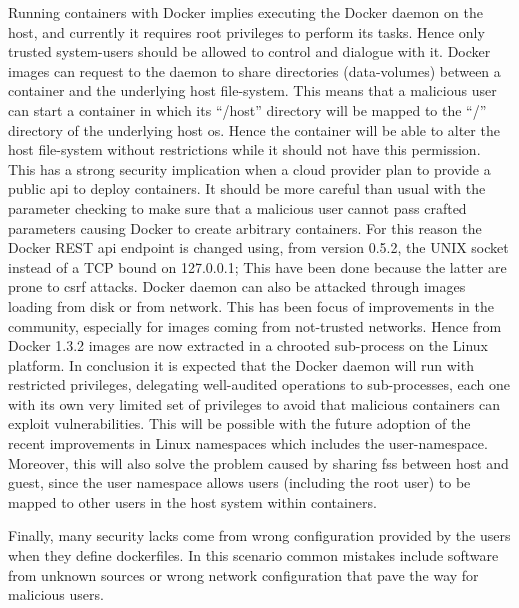 Running containers with Docker implies executing the Docker daemon on the host, and currently it requires
root privileges to perform its tasks. Hence only trusted system-users should be allowed to control and dialogue
with it. Docker images can request to the daemon to share directories (data-volumes) between a container
and the underlying host file-system. This means that a malicious user can start a container in which its 
``/host'' directory will be mapped to the ``/'' directory of the underlying host \acs{os}. Hence the container
will be able to alter the host file-system without restrictions while it should not have this permission.
This has a strong security implication when a cloud provider plan to provide a public \acs{api} to deploy
containers. It should be more careful than usual with the parameter checking to make sure that a malicious
user cannot pass crafted parameters causing Docker to create arbitrary containers. For this reason the Docker
REST \acs{api} endpoint is changed using, from version 0.5.2, the UNIX socket instead of a TCP bound on
127.0.0.1; This have been done because the latter are prone to \ac{csrf} attacks. Docker daemon can also be
attacked through images loading from disk or from network. This has been focus of improvements in the community,
especially for images coming from not-trusted networks. Hence from Docker 1.3.2 images are now extracted in a
chrooted sub-process on the Linux platform. In conclusion it is expected that the Docker daemon will run with
restricted privileges, delegating well-audited operations to sub-processes, each one with its own very limited
set of privileges to avoid that malicious containers can exploit vulnerabilities. This will be possible with the
future adoption of the recent improvements in Linux namespaces which includes the user-namespace. Moreover, this
will also solve the problem caused by sharing \ac{fs}s between host and guest, since the user namespace
allows users (including the root user) to be mapped to other users in the host system within containers.

Finally, many security lacks come from wrong configuration provided by the users when they define dockerfiles.
In this scenario common mistakes include software from unknown sources or wrong network configuration that
pave the way for malicious users.